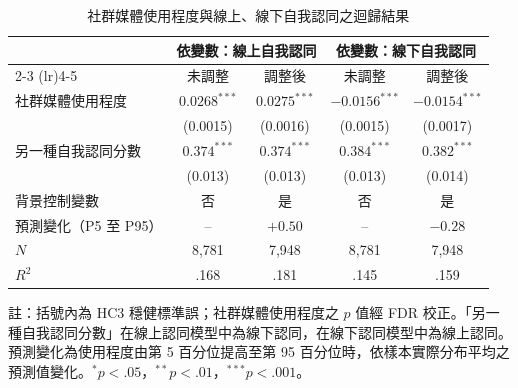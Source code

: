 \begin{table}[htbp]
\centering
\caption{社群媒體使用程度與線上、線下自我認同之迴歸結果}
\label{tab:ext}
\footnotesize
\setlength{\tabcolsep}{8pt}
\renewcommand{\arraystretch}{1.12}
\begin{tabular}{l cccc}
\toprule
& \multicolumn{2}{c}{依變數：線上自我認同} & \multicolumn{2}{c}{依變數：線下自我認同} \\
\cmidrule(lr){2-3} \cmidrule(lr){4-5}
& 未調整 & 調整後 & 未調整 & 調整後 \\
\midrule
社群媒體使用程度 & $0.0268^{***}$ & $0.0275^{***}$ & $-0.0156^{***}$ & $-0.0154^{***}$ \\
 & (0.0015) & (0.0016) & (0.0015) & (0.0017) \\[1pt]
另一種自我認同分數 & $0.374^{***}$ & $0.374^{***}$ & $0.384^{***}$ & $0.382^{***}$ \\
 & (0.013) & (0.013) & (0.013) & (0.014) \\[1pt]
\midrule
背景控制變數 & 否 & 是 & 否 & 是 \\
預測變化（P5 至 P95） & -- & $+0.50$ & -- & $-0.28$ \\
$N$ & 8,781 & 7,948 & 8,781 & 7,948 \\
$R^2$ & .168 & .181 & .145 & .159 \\
\bottomrule
\end{tabular}

\vspace{0.4em}
\parbox{\linewidth}{\scriptsize 註：括號內為 HC3 穩健標準誤；社群媒體使用程度之 $p$ 值經 FDR 校正。「另一種自我認同分數」在線上認同模型中為線下認同，在線下認同模型中為線上認同。預測變化為使用程度由第 5 百分位提高至第 95 百分位時，依樣本實際分布平均之預測值變化。$^{*}p<.05$，$^{**}p<.01$，$^{***}p<.001$。}
\end{table}
